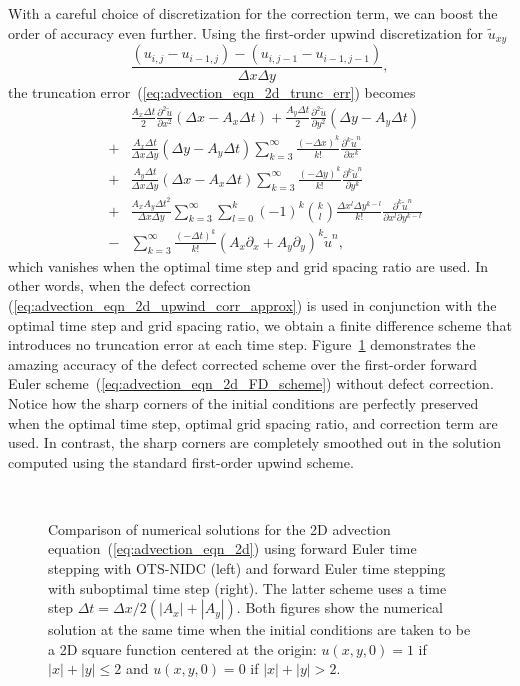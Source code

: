 \documentclass[fleqn,12pt,twoside]{article}
\newcommand{\beq}{\begin{equation}}
\newcommand{\eeq}{\end{equation}}
\newcommand{\bea}{\begin{eqnarray}}
\newcommand{\eea}{\end{eqnarray}}
\def\px{\partial x}
\def\py{\partial y}
\def\tu{\tilde{u}}
\def\dt{\Delta t}
\def\dx{\Delta x}
\def\dy{\Delta y}
\begin{document}
With a careful choice of discretization for the correction term, we can
boost the order of accuracy even further.  Using the first-order upwind 
discretization for $\tu_{xy}$
\beq
   \frac{ \left(u_{i,j} - u_{i-1,j}\right) 
        - \left(u_{i,j-1} - u_{i-1,j-1}\right)}
        {\dx \dy},
  \label{eq:advection_eqn_2d_upwind_corr_approx}
\eeq
the truncation error~(\ref{eq:advection_eqn_2d_trunc_err}) becomes
\bea
  & &
      \frac{A_x \dt}{2} \frac{\partial^2 \tu}{\px^2}
      \left( \dx - A_x \dt \right)
    + \frac{A_y \dt}{2} \frac{\partial^2 \tu}{\py^2}
      \left( \dy - A_y \dt \right)
   \nonumber \\
   &+& \frac{A_x\dt}{\dx \dy} ( \dy - A_y \dt )
       \sum_{k=3}^\infty \frac{\left( -\dx \right)^k}{k!} 
              \frac{\partial^k \tu^n}{\px^k} 
   \nonumber \\
   &+& \frac{A_y\dt}{\dx \dy} ( \dx - A_x \dt )
       \sum_{k=3}^\infty \frac{\left( -\dy \right)^k}{k!} 
              \frac{\partial^k \tu^n}{\py^k} 
   \nonumber \\
   &+& \frac{A_x A_y\dt^2}{\dx \dy} 
       \sum_{k=3}^\infty \sum_{l=0}^{k}
              (-1)^k {k \choose l}
              \frac{\dx^l \dy^{k-l}}{k!} 
              \frac{\partial^k \tu^n}{\px^l \py^{k-l}} 
   \nonumber \\
   &-& \sum_{k=3}^\infty \frac{\left( -\dt \right)^k}{k!} 
       \left( A_x \partial_x + A_y \partial_y
              \right)^k \tu^{n} 
  \label{eq:advection_eqn_2d_trunc_err_mod},
\eea
which vanishes when the optimal time step and grid spacing ratio are used.
In other words, when the defect correction 
(\ref{eq:advection_eqn_2d_upwind_corr_approx}) is used 
in conjunction with the optimal time step and grid spacing ratio, we obtain
a finite difference scheme that introduces no truncation error at each time 
step.  Figure~\ref{fig:advection_eqn_2d_soln} demonstrates the amazing accuracy 
of the defect corrected scheme over the first-order forward Euler 
scheme~(\ref{eq:advection_eqn_2d_FD_scheme}) without defect correction.
Notice how the sharp corners of the initial conditions are perfectly 
preserved when the optimal time step, optimal grid spacing ratio, and 
correction term are used.  In contrast, the sharp corners are
completely smoothed out in the solution computed using the standard 
first-order upwind scheme. 

\begin{figure}[tb]
\begin{center}
\ \ \ \ \ \ \ 
\caption{Comparison of numerical solutions for the 2D advection
equation~(\ref{eq:advection_eqn_2d}) using forward Euler time stepping 
with OTS-NIDC (left) and forward Euler time 
stepping with suboptimal time step (right).  The latter scheme uses a 
time step $\dt = \dx / 2 (|A_x|+|A_y|)$.  
Both figures show the numerical solution at the same time when the 
initial conditions are taken to be a 2D square function centered at the
origin: $u(x,y,0) = 1$ if $|x| + |y| \le 2$ and 
$u(x,y,0) = 0$ if $|x| + |y| > 2$. 
}
\label{fig:advection_eqn_2d_soln}
\end{center}
\end{figure}
\end{document}
